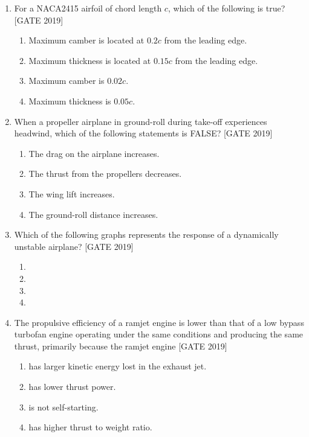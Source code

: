 \documentclass[journal,12pt,onecolumn]{IEEEtran}
\theoremstyle{remark}
\begin{document}
\begin{enumerate}
    \item For a NACA2415 airfoil of chord length $c$, which of the following is true?
    \hfill{[GATE 2019]}

        \begin{enumerate}
            \item Maximum camber is located at $0.2c$ from the leading edge.
            \item Maximum thickness is located at $0.15c$ from the leading edge.
            \item Maximum camber is $0.02c$.
            \item Maximum thickness is $0.05c$.\\
        \end{enumerate}

\item When a propeller airplane in ground-roll during take-off experiences headwind, which of the following statements is FALSE?
    \hfill{[GATE 2019]}
    \begin{multicols}{2}
        \begin{enumerate}
            \item The drag on the airplane increases.
            \item The thrust from the propellers decreases.
            \item The wing lift increases.
            \item The ground-roll distance increases.
        \end{enumerate}
    \end{multicols}

    \item Which of the following graphs represents the response of a dynamically unstable airplane?
    \hfill{[GATE 2019]}
    \begin{multicols}{2}
        \begin{enumerate}
        \item 
        \item 
        \item 
        \item 
        \end{enumerate}
    \end{multicols}

\item The propulsive efficiency of a ramjet engine is lower than that of a low bypass turbofan engine operating under the same conditions and producing the same thrust, primarily because the ramjet engine
    \hfill{[GATE 2019]}
    \begin{multicols}{2}
        \begin{enumerate}
            \item has larger kinetic energy lost in the exhaust jet.
            \item has lower thrust power.
            \item is not self-starting.
            \item has higher thrust to weight ratio.
        \end{enumerate}
    \end{multicols}


\end{enumerate}
\end{document}
